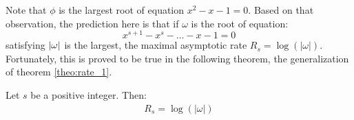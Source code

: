 Note that $\phi$ is the largest root of equation $x^{2}-x-1=0$. Based on that observation, the prediction here is that if $\omega$ is the root of equation:
\begin{equation}
    x^{s+1}-x^{s}-\ldots-x-1 = 0\label{eq:char_eq}
\end{equation}
satisfying $\left \lvert \omega \right \rvert$ is the largest, the maximal asymptotic rate $R_{s}=\log(\lvert\omega\rvert)$. Fortunately, this is proved to be true in the following theorem, the generalization of theorem \ref{theo:rate_1}.
    

\begin{theorem}\label{theo:rate_s}
    Let $s$ be a positive integer. Then:
    \begin{align}
        R_{s} = \log(\lvert\omega\rvert)
    \end{align}
\end{theorem}
